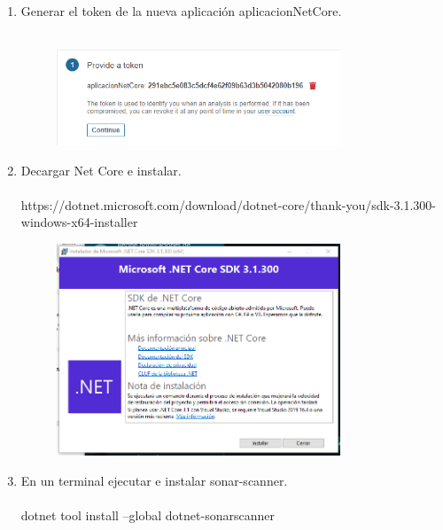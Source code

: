 \documentclass{report}
\begin{document}
\begin{enumerate}
		
		
		\item {\large Generar el token de la nueva aplicación aplicacionNetCore.}\\\\
		
		\begin{figure}[htb]
			\centering
			\includegraphics[width=0.8\textwidth]{img/token.png}
			\label{fig:token}
		\end{figure}
		
		\item {\large Decargar Net Core e instalar.}\\\\
		
		https://dotnet.microsoft.com/download/dotnet-core/thank-you/sdk-3.1.300-windows-x64-installer \\
		\begin{figure}[htb]
			\centering
			\includegraphics[width=0.8\textwidth]{img/netcoredown.png}
			\label{fig:netcoredown}
		\end{figure}
	

	
		\item {\large En un terminal ejecutar e instalar sonar-scanner.}\\\\
		
		dotnet tool install --global dotnet-sonarscanner \\
		

\end{enumerate}
\end{document}

